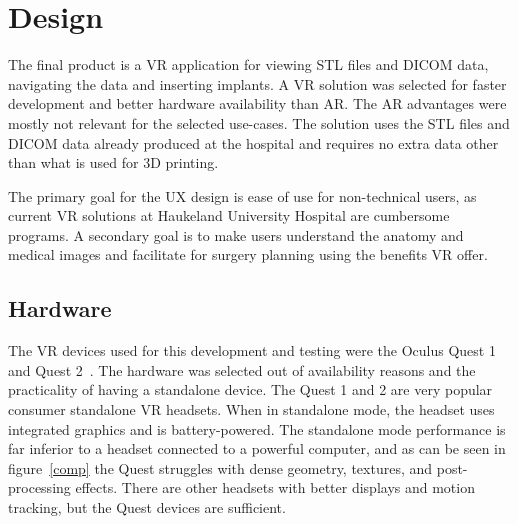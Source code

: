 \documentclass[a4paper]{report}
\begin{document}
\section{Design}


The final product is a VR application for viewing STL files and DICOM data, navigating the data and inserting implants. A VR solution was selected for faster development and better hardware availability than AR. The AR advantages were mostly not relevant for the selected use-cases.
The solution uses the STL files and DICOM data already produced at the hospital and requires no extra data other than what is used for 3D printing.

The primary goal for the UX design is ease of use for non-technical users, as current VR solutions at Haukeland University Hospital are cumbersome programs.
A secondary goal is to make users understand the anatomy and medical images and facilitate for surgery planning using the benefits VR offer.

\subsection{Hardware}
The VR devices used for this development and testing were the Oculus Quest 1 and Quest 2~\cite{noauthor_oculus_nodate}. The hardware was selected out of availability reasons and the practicality of having a standalone device.
The Quest 1 and 2 are very popular consumer standalone VR headsets. When in standalone mode, the headset uses integrated graphics and is battery-powered. The standalone mode performance is far inferior to a headset connected to a powerful computer, and as can be seen in figure~\ref{comp} the Quest struggles with dense geometry, textures, and post-processing effects.
There are other headsets with better displays and motion tracking, but the Quest devices are sufficient.
\end{document}
